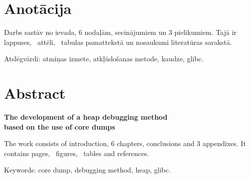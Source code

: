 \chapter*{Anotācija}
\thispagestyle{empty}
	

	Darbs sastāv no ievada, 6 nodaļām, secinājumiem un 3 pielikumiem. Tajā ir \pageref{LastPage} lappuses, \totfig\ attēli, \tottab\ tabulas pamattekstā un  nosaukumi literatūras sarakstā.

Atslēgvārdi: atmiņas izmete, atkļūdošanas metode, kaudze, glibc.

\newpage

\chapter*{Abstract}
\begin{center}
\linespread{1.2}
\vspace{-0.3cm}
\large \textbf {The development of a heap debugging method \protect\\  based on the use of core dumps}
\end{center}

\thispagestyle{empty}
	The work consists of introduction, 6 chapters, conclusions and 3 appendixes. It contains \pageref{LastPage} pages, \totfig\ figures, \tottab\ tables and  references.

Keywords: core dump, debugging method, heap, glibc.


\newpage 